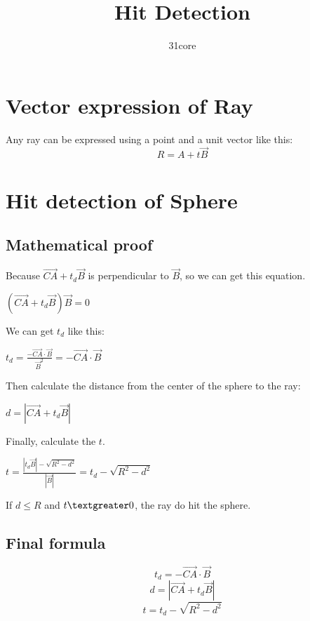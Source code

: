 \documentclass{article}
\begin{document}
\title{Hit Detection}
\author{31core}
\maketitle
\newpage
\tableofcontents
\newpage
\setlength{\parindent}{0em}
\section{Vector expression of Ray}
Any ray can be expressed using a point and a unit vector like this:
\begin{equation}
R = A + t\vec{B}
\end{equation}

\section{Hit detection of Sphere}
\subsection{Mathematical proof}

Because $\vec{CA} + t_d\vec{B}$ is perpendicular to $\vec{B}$, so we can get this equation.

$(\vec{CA} + t_d\vec{B})\vec{B} = 0$

We can get $t_d$ like this:

$t_d = \frac{ - \vec{CA} \cdot \vec{B} }{ \vec{B}^2 } = -\vec{CA} \cdot  \vec{B}$

Then calculate the distance from the center of the sphere to the ray:

$d = |\vec{CA} + t_d\vec{B}|$

Finally, calculate the $t$.

$t = \frac{|t_d\vec{B}| - \sqrt{R^2 - d^2}}{|\vec{B}|} = t_d - \sqrt{R^2 - d^2}$

If $d \leq R$ and $t \textgreater 0$, the ray do hit the sphere.

\subsection{Final formula}
\begin{equation}
t_d = -\vec{CA} \cdot  \vec{B}
\end{equation}
\begin{equation}
d = |\vec{CA} + t_d\vec{B}|
\end{equation}
\begin{equation}
t = t_d - \sqrt{R^2 - d^2}
\end{equation}
\end{document}
